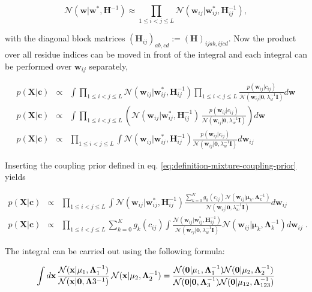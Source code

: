\documentclass[11pt,a4paper,twoside]{book}
\newcommand{\Gauss}{\mathcal{N}}
\renewcommand{\H}{\mathbf{H}}
\newcommand{\I}{\mathbf{I}}
\newcommand{\Lk}{\mathbf{\Lambda}_k}
\newcommand{\muk}{\mathbf{\mu}_k}
\renewcommand{\c}{\mathbf{c}}
\newcommand{\cij}{c_{ij}}
\newcommand{\seq}{\mathbf{x}}
\newcommand{\w}{\mathbf{w}}
\newcommand{\wij}{\mathbf{w}_{ij}}
\newcommand{\X}{\mathbf{X}}
\theoremstyle{definition}
\theoremstyle{definition}
\theoremstyle{remark}
\begin{document}
\begin{equation}
  \Gauss (\w | \w^{*}, \H^{-1}) \approx \prod_{1 \le i < j \le L} \Gauss (\wij | \wij^{*}, \H_{ij}^{-1}) ,
\end{equation}

with the diagonal block matrices
\((\H_{ij})_{ab,cd} := (\H)_{ijab,ijcd}\). Now the product over all
residue indices can be moved in front of the integral and each integral
can be performed over \(\wij\) separately,

\begin{eqnarray}
  p(\X | \c) &\propto& \int \prod_{1 \le i < j \le L} \Gauss (\wij | \wij^{*}, \H_{ij}^{-1}) \prod_{1 \le i<j \le L} \frac{p(\wij | \cij)}{\Gauss(\wij|\mathbf{0}, \lambda_w^{-1} \I)} d\w  \\
  p(\X | \c) &\propto& \int \prod_{1\le i<j\le L} \left(  \Gauss (\wij | \wij^*, \H_{ij}^{-1}) \, \frac{p(\wij | \cij)}{\Gauss(\wij | \mathbf{0}, \lambda_w^{-1} \I)} \right) d\w \\
  p(\X | \c) &\propto& \prod_{1\le i<j\le L}  \int \Gauss (\wij | \wij^*, \H_{ij}^{-1}) \frac{p(\wij | \cij)}{\Gauss (\wij | \mathbf{0}, \lambda_w^{-1} \I)} d \wij 
\label{eq:int-over-w-2}
\end{eqnarray}

Inserting the coupling prior defined in eq.
\eqref{eq:definition-mixture-coupling-prior} yields

\begin{eqnarray}
   p(\X | \c) &\propto& \prod_{1\le i<j\le L} \int \Gauss (\wij | \wij^*, \H_{ij}^{-1}) \frac{\sum_{k=0}^K g_{k}(\cij) \Gauss(\wij | \muk, \Lk^{-1})}{\Gauss (\wij | \mathbf{0}, \lambda_w^{-1} \I)} d \wij \\
   p(\X | \c) &\propto& \prod_{1\le i<j\le L} \sum_{k=0}^K g_{k}(\cij) \int \frac{\Gauss (\wij | \wij^*, \H_{ij}^{-1})}{\Gauss (\wij | \mathbf{0}, \lambda_w^{-1} \I)} \Gauss(\wij | \muk, \Lk^{-1}) d\wij \; .
\label{eq:int-over-w-3}
\end{eqnarray}

The integral can be carried out using the following formula:

\begin{equation}
    \int d\seq \, \frac{ \Gauss( \seq | \mathbf{\mu}_1, \mathbf{\Lambda}_1^{-1}) }{\Gauss(\seq|\mathbf{0},\mathbf{\Lambda}3^{-1})} \, \Gauss(\seq|\mathbf{\mu}_2,\mathbf{\Lambda}_2^{-1}) = \\
    \frac{\Gauss(\mathbf{0}| \mathbf{\mu}_1, \mathbf{\Lambda}_{1}^{-1}) \Gauss(\mathbf{0}| \mathbf{\mu}_2, \mathbf{\Lambda}_{2}^{-1})}{\Gauss(\mathbf{0}|\mathbf{0}, \mathbf{\Lambda}_{3}^{-1}) \Gauss(\mathbf{0}| \mathbf{\mu}_{12}, \mathbf{\Lambda}_{123}^{-1})} 
\end{equation}
\end{document}
